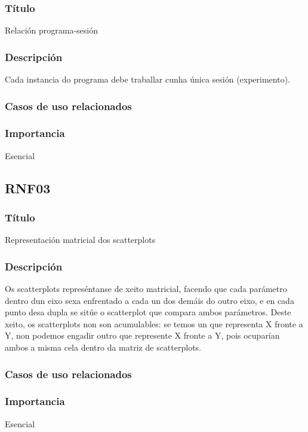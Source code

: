 \subsubsection{Título}
Relación programa-sesión
\subsubsection{Descripción}
Cada instancia do programa debe traballar cunha única sesión (experimento).
\subsubsection{Casos de uso relacionados}
\subsubsection{Importancia}
Esencial

\subsection*{RNF03}
\subsubsection{Título}
Representación matricial dos scatterplots
\subsubsection{Descripción}
Os scatterplots represéntanse de xeito matricial, facendo que cada parámetro dentro dun eixo sexa enfrentado a cada un dos demáis do outro eixo, e en cada punto desa dupla se sitúe o scatterplot que compara ambos parámetros. Deste xeito, os scatterplots non son acumulables: se temos un que representa X fronte a Y, non podemos engadir outro que represente X fronte a Y, pois ocuparían ambos a misma cela dentro da matriz de scatterplots.
\subsubsection{Casos de uso relacionados}
\subsubsection{Importancia}
Esencial


